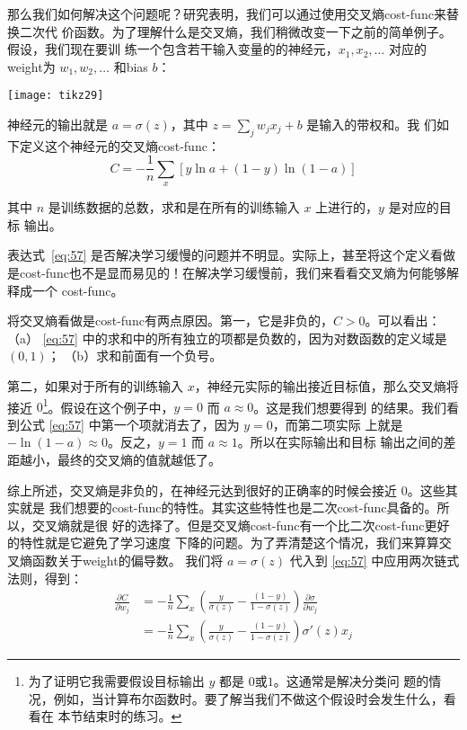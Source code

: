那么我们如何解决这个问题呢？研究表明，我们可以通过使用交叉熵\gls*{cost-func}来替换二次代
价函数。为了理解什么是交叉熵，我们稍微改变一下之前的简单例子。假设，我们现在要训
练一个包含若干输入变量的的神经元，$x_1, x_2, \ldots$ 对应的\gls*{weight}为 $w_1,
w_2, \ldots$ 和\gls*{bias} $b$：

\begin{center}
  \texttt{[image: tikz29]}
\end{center}

神经元的输出就是 $a = \sigma(z)$，其中 $z = \sum_j w_j x_j+b$ 是输入的带权和。我
们如下定义这个神经元的交叉熵\gls*{cost-func}：
\begin{equation}
  C = -\frac{1}{n} \sum_x \left[y \ln a + (1-y ) \ln (1-a) \right]
\label{eq:57}\tag{57}
\end{equation}

其中 $n$ 是训练数据的总数，求和是在所有的训练输入 $x$ 上进行的，$y$ 是对应的目标
输出。

表达式~\eqref{eq:57} 是否解决学习缓慢的问题并不明显。实际上，甚至将这个定义看做
是\gls*{cost-func}也不是显而易见的！在解决学习缓慢前，我们来看看交叉熵为何能够解释成一个
\gls*{cost-func}。

将交叉熵看做是\gls*{cost-func}有两点原因。第一，它是非负的，$C > 0$。可以看出：（a）
\eqref{eq:57} 中的求和中的所有独立的项都是负数的，因为对数函数的定义域是 $(0,1)$；
      （b）求和前面有一个负号。

第二，如果对于所有的训练输入 $x$，神经元实际的输出接近目标值，那么交叉熵将接近
$0$\footnote{为了证明它我需要假设目标输出 $y$ 都是 $0$或$1$。这通常是解决分类问
  题的情况，例如，当计算布尔函数时。要了解当我们不做这个假设时会发生什么，看看在
  本节结束时的练习。}。假设在这个例子中，$y=0$ 而 $a\approx 0$。这是我们想要得到
的结果。我们看到公式 \eqref{eq:57} 中第一个项就消去了，因为 $y=0$，而第二项实际
上就是 $-\ln (1-a)\approx 0$。反之，$y=1$ 而 $a\approx 1$。所以在实际输出和目标
输出之间的差距越小，最终的交叉熵的值就越低了。

综上所述，交叉熵是非负的，在神经元达到很好的正确率的时候会接近 $0$。这些其实就是
我们想要的\gls*{cost-func}的特性。其实这些特性也是二次\gls*{cost-func}具备的。所以，交叉熵就是很
好的选择了。但是交叉熵\gls*{cost-func}有一个比二次\gls*{cost-func}更好的特性就是它避免了学习速度
下降的问题。为了弄清楚这个情况，我们来算算交叉熵函数关于\gls*{weight}的偏导数。
我们将 $a=\sigma(z)$ 代入到 \eqref{eq:57} 中应用两次链式法则，得到：
\begin{align}
  \frac{\partial C}{\partial w_j} &= -\frac{1}{n} \sum_x \left(
  \frac{y }{\sigma(z)} -\frac{(1-y)}{1-\sigma(z)} \right)
  \frac{\partial \sigma}{\partial w_j} \label{eq:58}\tag{58}\\
  &= -\frac{1}{n} \sum_x \left(
  \frac{y}{\sigma(z)}
  -\frac{(1-y)}{1-\sigma(z)} \right)\sigma'(z) x_j \label{eq:59}\tag{59}
\end{align}

